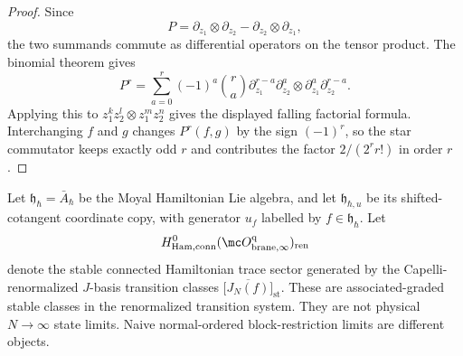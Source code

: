 \documentclass[11pt]{memoir}
\begin{document}
\begin{proof}
  Since
  $$P=\partial_{z_1}\otimes\partial_{z_2}
    -\partial_{z_2}\otimes\partial_{z_1},$$
  the two summands commute as differential operators on the tensor product.
  The binomial theorem gives
  $$P^r=\sum_{a=0}^r(-1)^a\binom{r}{a}
    \partial_{z_1}^{r-a}\partial_{z_2}^{a}
    \otimes
    \partial_{z_1}^{a}\partial_{z_2}^{r-a}.$$
  Applying this to $z_1^kz_2^l\otimes z_1^mz_2^n$ gives the displayed falling
  factorial formula. Interchanging $f$ and $g$ changes $P^r(f,g)$ by the sign
  $(-1)^r$, so the star commutator keeps exactly odd $r$ and contributes the
  factor $2/(2^r r!)$ in order $r$.
\end{proof}

\begin{thm}\label{thm:phi-hbar-all-order}
  Let $\mathfrak h_\hbar=\bar A_\hbar$ be the Moyal Hamiltonian Lie algebra,
  and let \(\mathfrak h_{\hbar,u}\) be its shifted-cotangent coordinate
  copy, with generator \(u_f\) labelled by \(f\in\mathfrak h_\hbar\). Let
  $$H^0_{\mathrm{Ham,conn}}
    (\mc O^{\mathrm q}_{\mathrm{brane},\infty})_{\mathrm{ren}}$$
  denote the stable connected Hamiltonian trace sector generated by the
  Capelli-renormalized \(J\)-basis transition classes
  \(\bigl[\overline{J_N(f)}\bigr]_{\mathrm{st}}\).  These are
  associated-graded stable classes in the renormalized transition system.
  They are not physical \(N\to\infty\) state limits.  Naive
  normal-ordered block-restriction limits are different objects.


\end{thm}
\end{document}
